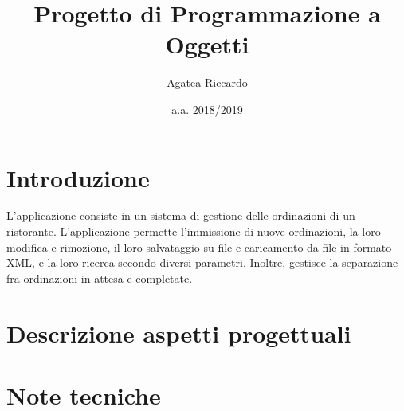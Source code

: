 \documentclass{article}
\title{Progetto di Programmazione a Oggetti}
\author{Agatea Riccardo}
\date{a.a. 2018/2019}
\begin{document}
\maketitle
\newpage
{}
\section{Introduzione} %
\label{sec:introduzione}
L'applicazione consiste in un sistema di gestione delle ordinazioni di un ristorante. L'applicazione permette l'immissione di nuove ordinazioni, la loro modifica e rimozione, il loro salvataggio su file e caricamento da file in formato XML, e la loro ricerca secondo diversi parametri. Inoltre, gestisce la separazione fra ordinazioni in attesa e completate.
\section{Descrizione aspetti progettuali} %
\label{sec:descrizione_aspetti_progettuali}



\section{Note tecniche} %
\label{sec:note_tecniche}



\end{document}
